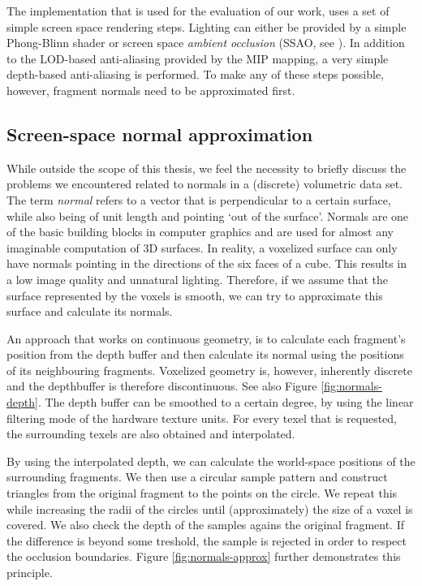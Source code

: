 The implementation that is used for the evaluation of our work, uses a set of simple screen space rendering steps. Lighting can either be provided by a simple Phong-Blinn shader or screen space \emph{ambient occlusion} (SSAO, see \cite{ssao}). In addition to the LOD-based anti-aliasing provided by the MIP mapping, a very simple depth-based anti-aliasing is performed. To make any of these steps possible, however, fragment normals need to be approximated first.
%
\subsection{Screen-space normal approximation}
%
While outside the scope of this thesis, we feel the necessity to briefly discuss the problems we encountered related to normals in a (discrete) volumetric data set. The term \emph{normal} refers to a vector that is perpendicular to a certain surface, while also being of unit length and pointing `out of the surface'. Normals are one of the basic building blocks in computer graphics and are used for almost any imaginable computation of 3D surfaces.  In reality, a voxelized surface can only have normals pointing in the directions of the six faces of a cube. This results in a low image quality and unnatural lighting. Therefore, if we assume that the surface represented by the voxels is smooth, we can try to approximate this surface and calculate its normals.

An approach that works on continuous geometry, is to calculate each fragment's position from the depth buffer and then calculate its normal using the positions of its neighbouring fragments. Voxelized geometry is, however, inherently discrete and the depthbuffer is therefore discontinuous. See also Figure \ref{fig:normals-depth}. The depth buffer can be smoothed to a certain degree, by using the linear filtering mode of the hardware texture units. For every texel that is requested, the surrounding texels are also obtained and interpolated. 

By using the interpolated depth, we can calculate the world-space positions of the surrounding fragments. We then use a circular sample pattern and construct triangles from the original fragment to the points on the circle. We repeat this while increasing the radii of the circles until (approximately) the size of a voxel is covered. We also check the depth of the samples agains the original fragment. If the difference is beyond some treshold, the sample is rejected in order to respect the occlusion boundaries. Figure \ref{fig:normals-approx} further demonstrates this principle.

